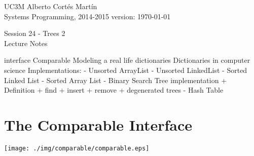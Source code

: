 \documentclass[a4paper, 9pt]{extarticle}
\newcommand{\realtitle}{Session 24 - Trees 2}
\begin{document}
\makebox[\linewidth]{\rule{\textwidth}{0.4pt}}
UC3M \hfill Alberto Cortés Martín\\
Systems Programming, 2014-2015 \hfill version: \today\\
\makebox[\linewidth]{\rule{\textwidth}{0.4pt}}
\begin{center}
  \Large{\realtitle}\\Lecture Notes
\end{center}
\makebox[\linewidth]{\rule{\textwidth}{0.4pt}}
\vspace{1cm}

\begin{blackboard}
interface Comparable
Modeling a real life dictionaries
Dictionaries in computer science
Implementations:
 - Unsorted ArrayList
 - Unsorted LinkedList
 - Sorted Linked List
 - Sorted Array List
 - Binary Search Tree implementation
   + Definition
   + find
   + insert
   + remove
   + degenerated trees
 - Hash Table
\end{blackboard}


\section{The Comparable Interface}

\begin{center}
  \texttt{[image: ./img/comparable/comparable.eps]}
\end{center}
\end{document}
